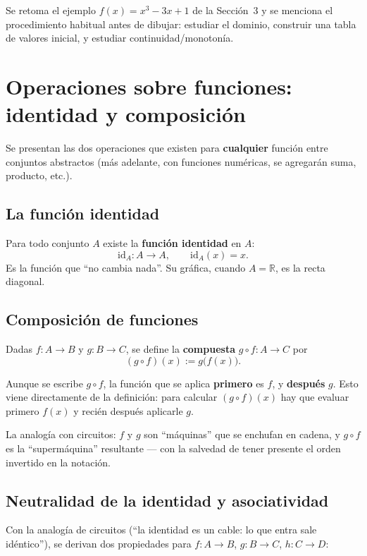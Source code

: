 \documentclass[12pt,a4paper]{article}
\begin{document}
Se retoma el ejemplo $f(x) = x^3-3x+1$ de la Sección~3 y se menciona el procedimiento habitual antes de dibujar: estudiar el dominio, construir una tabla de valores inicial, y estudiar continuidad/monotonía.

\section{Operaciones sobre funciones: identidad y composición}

Se presentan las dos operaciones que existen para \textbf{cualquier} función entre conjuntos abstractos (más adelante, con funciones numéricas, se agregarán suma, producto, etc.).

\subsection{La función identidad}

Para todo conjunto $A$ existe la \textbf{función identidad} en $A$:
$$\mathrm{id}_A : A \to A, \qquad \mathrm{id}_A(x) = x.$$
Es la función que ``no cambia nada''. Su gráfica, cuando $A=\mathbb{R}$, es la recta diagonal.

\subsection{Composición de funciones}

Dadas $f:A\to B$ y $g:B\to C$, se define la \textbf{compuesta} $g \circ f : A \to C$ por
$$(g \circ f)(x) := g\big(f(x)\big).$$

\begin{warnbox}
Aunque se escribe $g \circ f$, la función que se aplica \textbf{primero} es $f$, y \textbf{después} $g$. Esto viene directamente de la definición: para calcular $(g\circ f)(x)$ hay que evaluar primero $f(x)$ y recién después aplicarle $g$.
\end{warnbox}

La analogía con circuitos: $f$ y $g$ son ``máquinas'' que se enchufan en cadena, y $g\circ f$ es la ``supermáquina'' resultante --- con la salvedad de tener presente el orden invertido en la notación.

\subsection{Neutralidad de la identidad y asociatividad}

Con la analogía de circuitos (``la identidad es un cable: lo que entra sale idéntico''), se derivan dos propiedades para $f:A\to B$, $g:B\to C$, $h:C\to D$:
\end{document}
